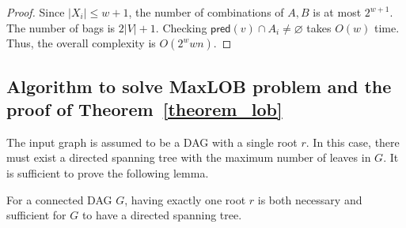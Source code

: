 \documentclass[runningheads]{llncs}
\theoremstyle{plain}
\theoremstyle{definition}
\begin{document}
\begin{proof}
    Since $|X_i| \leq w+1$, the number of combinations of $A, B$ is at most $2^{w+1}$. The number of bags is $2|V|+1$. Checking $\mathsf{pred}(v) \cap A_i \neq \varnothing$ takes $O(w)$ time. Thus, the overall complexity is $O(2^w w n)$.
\end{proof}








\subsection{Algorithm to solve MaxLOB problem and the proof of \textbf{Theorem~\ref{theorem_lob}}}\label{appendix_B5}

The input graph is assumed to be a DAG with a single root $r$. In this case, there must exist a directed spanning tree with the maximum number of leaves in $G$. It is sufficient to prove the following lemma.

\begin{lemma}\label{lemma_spanning}
    For a connected DAG $G$, having exactly one root $r$ is both necessary and sufficient for $G$ to have a directed spanning tree.
\end{lemma}
\end{document}

